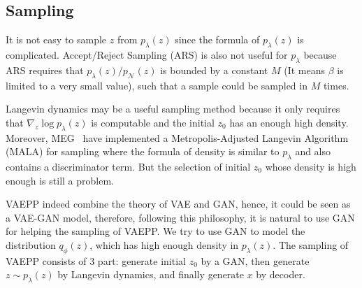 \subsection{Sampling}
It is not easy to sample $z$ from $p_\lambda(z)$ since the formula of $p_\lambda(z)$ is complicated. Accept/Reject Sampling (ARS) is also not useful for $p_\lambda$ because ARS requires that $p_\lambda(z) / p_\mathcal{N}(z)$ is bounded by a constant $M$ (It means $\beta$ is limited to a very small value), such that a sample could be sampled in $M$ times. 

Langevin dynamics may be a useful sampling method because it only requires that $\nabla_z \log p_\lambda(z)$ is computable and the initial $z_0$ has an enough high density. Moreover, MEG~\cite{kumar2019maximum} have implemented a Metropolis-Adjusted Langevin Algorithm (MALA) for sampling where the formula of density is similar to $p_\lambda$ and also contains a discriminator term. But the selection of initial $z_0$ whose density is high enough is still a problem. 

VAEPP indeed combine the theory of VAE and GAN, hence, it could be seen as a VAE-GAN model, therefore, following this philosophy, it is natural to use GAN for helping the sampling of VAEPP. We try to use GAN to model the distribution $q_\phi(z)$, which has high enough density in $p_\lambda(z)$. The sampling of VAEPP consists of 3 part: generate initial $z_0$ by a GAN, then generate $z \sim p_\lambda(z)$ by Langevin dynamics, and finally generate $x$ by decoder. 


 
 